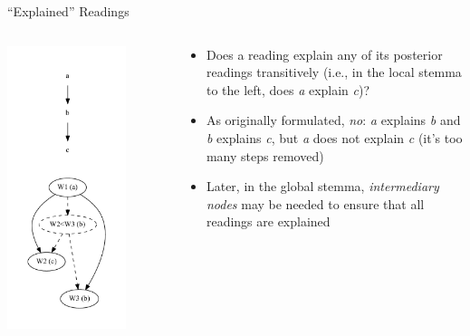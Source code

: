 \documentclass[10pt]{beamer}
\begin{document}
	\begin{frame}{``Explained'' Readings}
		\begin{columns}
			\begin{column}{0.4\textwidth}
				\centering
				\includegraphics[width=0.75\textwidth]{../graphics/intermediary-node-example.pdf}
			\end{column}
			\begin{column}{0.55\textwidth}
				\begin{itemize}
					\item Does a reading explain any of its posterior readings transitively (i.e., in the local stemma to the left, does \emph{a} explain \emph{c})?
					\item As originally formulated, \emph{no}: \emph{a} explains \emph{b} and \emph{b} explains \emph{c}, but \emph{a} does not explain \emph{c} (it's too many steps removed)
					\item Later, in the global stemma, \emph{intermediary nodes} may be needed to ensure that all readings are explained
				\end{itemize}
			\end{column}
		\end{columns}
	\end{frame}
\end{document}
